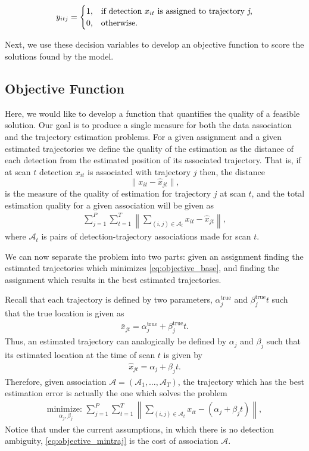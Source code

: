 \begin{align}
y_{itj} =
\begin{cases}
1, & \text{if detection $x_{it}$ is assigned to trajectory \textit{j},} \\
0, & \text{otherwise.}
\end{cases}
\end{align}

Next, we use these decision variables to develop an objective function to score the solutions found by the model. 

\subsection{Objective Function}
Here, we would like to develop a function that quantifies the quality of a feasible solution. Our goal is to produce a single measure for both the data association and the trajectory estimation problems. For a given assignment and a given estimated trajectories we define the quality of the estimation as the distance of each detection from the estimated position of its associated trajectory. That is, if at scan $t$ detection $x_{it}$ is associated with trajectory $j$ then, the distance 
$$\|x_{it}-\hat{x}_{jt}\|,$$
is the measure of the quality of estimation for trajectory $j$ at scan $t$, and the total estimation quality for a given association will be given as 
\begin{align}\label{eq:objective_base}
\sum_{j=1}^P\sum_{t=1}^T\left\|\sum_{(i,j)\in \mathcal{A}_{t}} x_{it} - \hat{x}_{jt}\right\|,
\end{align} 
where $\mathcal{A}_t$ is pairs of detection-trajectory associations made for scan $t$. 

We can now separate the problem into two parts: given an assignment finding the estimated trajectories which minimizes \eqref{eq:objective_base}, and finding the assignment which results in the best estimated trajectories.

Recall that each trajectory is defined by two parameters, $\alpha^{\text{true}}_{j}$ and $\beta^{\text{true}}_{j}t$ such that the true location is given as 
\begin{align}
	\bar{x}_{jt} = \alpha^{\text{true}}_{j} + \beta^{\text{true}}_{j}t.
\end{align}
Thus, an estimated trajectory can analogically be defined by  $\alpha_{j}$ and $\beta_{j}$ such that its estimated location at the time of scan $t$ is given by
\begin{align}
	\hat{x}_{jt} =  \alpha_{j} + \beta_{j}t.
\end{align}
Therefore, given association $\mathcal{A}=(\mathcal{A}_1,\ldots,\mathcal{A}_T)$, the trajectory which has the best estimation error is actually the one which solves the problem
\begin{align}\label{eq:objective_mintraj}
\underset{\alpha_{j}, \beta_{j}}{\text{minimize: }}\sum_{j=1}^P\sum_{t=1}^T\left\|\sum_{(i,j)\in \mathcal{A}_{t}} x_{it} - (\alpha_{j} + \beta_{j}t)\right\|,
\end{align} 
Notice that under the current assumptions, in which there is no detection ambiguity, \eqref{eq:objective_mintraj} is the cost of association $\mathcal{A}$. 

